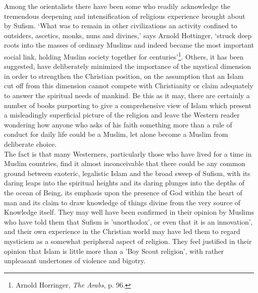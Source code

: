 \documentclass[10pt, twoside,openright]{book}
\begin{document}
Among the orientalists there have been some who readily acknowledge the tremendous deepening and 
intensification of religious experience brought about by Sufism. `What was to remain in other 
civilizations an activity confined to outsiders, ascetics, monks, nuns and divines,' says Arnold 
Hottinger, `struck deep roots into the masses of ordinary Muslims and indeed became the most 
important social link, holding Muslim society together for centuries'\footnote{Arnold Horringer, \emph{The Arabs}, p. 96.}. Others, it has been 
suggested, have deliberately minimized the importance of the mystical dimension in order to 
strengthen the Christian position, on the assumption that an Islam cut off from this dimension cannot 
compete with Christianity or claim adequately to answer the spiritual needs of mankind. Be this as it 
may, there are certainly a number of books purporting to give a comprehensive view of Islam which 
present a misleadingly superficial picture of the religion and leave the Western reader wondering how 
anyone who asks of his faith something more than a rule of conduct for daily life could be a Muslim, 
let alone become a Muslim from deliberate choice. \\

The fact is that many Westerners, particularly those who have lived for a time in Muslim countries, 
find it almost inconceivable that there could be any common ground between exoteric, legalistic Islam 
and the broad sweep of Sufism, with its daring leaps into the spiritual heights and its daring 
plunges into the depths of the ocean of Being, its emphasis upon the presence of God within the heart 
of man and its claim to draw knowledge of things divine from the very source of Knowledge itself. 
They may well have been confirmed in their opinion by Muslims who have told them that Sufism is 
'unorthodox', or even that it is an innovation', and their own experience in the Christian world may 
have led them to regard mysticism as a somewhat peripheral aspect of religion. They feel justified in 
their opinion that Islam is little more than a 'Boy Scout religion', with rather unpleasant 
undertones of violence and bigotry. \\
\end{document}
